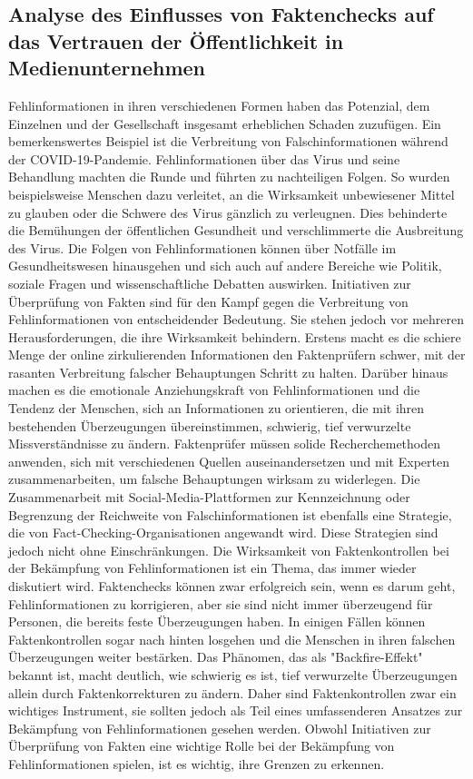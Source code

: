 \documentclass[a4paper,listof=totoc,bibliography=totoc]{scrartcl}
\begin{document}
\subsection{Analyse des Einflusses von Faktenchecks auf das Vertrauen der Öffentlichkeit in Medienunternehmen}
Fehlinformationen in ihren verschiedenen Formen haben das Potenzial, dem Einzelnen und der Gesellschaft insgesamt erheblichen Schaden zuzufügen. 
Ein bemerkenswertes Beispiel ist die Verbreitung von Falschinformationen während der COVID-19-Pandemie. Fehlinformationen über das Virus und seine 
Behandlung machten die Runde und führten zu nachteiligen Folgen. So wurden beispielsweise Menschen dazu verleitet, an die Wirksamkeit unbewiesener 
Mittel zu glauben oder die Schwere des Virus gänzlich zu verleugnen. Dies behinderte die Bemühungen der öffentlichen Gesundheit und verschlimmerte 
die Ausbreitung des Virus. Die Folgen von Fehlinformationen können über Notfälle im Gesundheitswesen hinausgehen und sich auch auf andere Bereiche 
wie Politik, soziale Fragen und wissenschaftliche Debatten auswirken.
Initiativen zur Überprüfung von Fakten sind für den Kampf gegen die Verbreitung von Fehlinformationen von entscheidender Bedeutung. Sie stehen jedoch 
vor mehreren Herausforderungen, die ihre Wirksamkeit behindern. Erstens macht es die schiere Menge der online zirkulierenden Informationen den Faktenprüfern 
schwer, mit der rasanten Verbreitung falscher Behauptungen Schritt zu halten. Darüber hinaus machen es die emotionale Anziehungskraft von Fehlinformationen und 
die Tendenz der Menschen, sich an Informationen zu orientieren, die mit ihren bestehenden Überzeugungen übereinstimmen, schwierig, tief verwurzelte Missverständnisse 
zu ändern. Faktenprüfer müssen solide Recherchemethoden anwenden, sich mit verschiedenen Quellen auseinandersetzen und mit Experten zusammenarbeiten, um falsche 
Behauptungen wirksam zu widerlegen. Die Zusammenarbeit mit Social-Media-Plattformen zur Kennzeichnung oder Begrenzung der Reichweite von Falschinformationen ist 
ebenfalls eine Strategie, die von Fact-Checking-Organisationen angewandt wird. Diese Strategien sind jedoch nicht ohne Einschränkungen.
Die Wirksamkeit von Faktenkontrollen bei der Bekämpfung von Fehlinformationen ist ein Thema, das immer wieder diskutiert wird. Faktenchecks können zwar erfolgreich 
sein, wenn es darum geht, Fehlinformationen zu korrigieren, aber sie sind nicht immer überzeugend für Personen, die bereits feste Überzeugungen haben. In 
einigen Fällen können Faktenkontrollen sogar nach hinten losgehen und die Menschen in ihren falschen Überzeugungen weiter bestärken. Das Phänomen, das als 
"Backfire-Effekt" bekannt ist, macht deutlich, wie schwierig es ist, tief verwurzelte Überzeugungen allein durch Faktenkorrekturen zu ändern. Daher sind 
Faktenkontrollen zwar ein wichtiges Instrument, sie sollten jedoch als Teil eines umfassenderen Ansatzes zur Bekämpfung von Fehlinformationen gesehen werden.
Obwohl Initiativen zur Überprüfung von Fakten eine wichtige Rolle bei der Bekämpfung von Fehlinformationen spielen, ist es wichtig, ihre Grenzen zu erkennen.\newline
\end{document}
